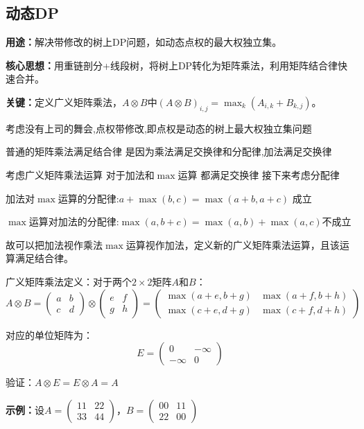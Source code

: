 \documentclass[a4paper, fontset=none]{ctexart}
\begin{document}
\subsection{动态DP}
\textbf{用途：}解决带修改的树上DP问题，如动态点权的最大权独立集。

\textbf{核心思想：}用重链剖分+线段树，将树上DP转化为矩阵乘法，利用矩阵结合律快速合并。

\textbf{关键：}定义广义矩阵乘法，$A \otimes B$中$(A \otimes B)_{i, j} = \max_k(A_{i, k} + B_{k, j})$。

考虑没有上司的舞会,点权带修改,即点权是动态的树上最大权独立集问题

普通的矩阵乘法满足结合律 是因为乘法满足交换律和分配律,加法满足交换律

考虑广义矩阵乘法运算 对于加法和$\max$运算 都满足交换律 接下来考虑分配律

加法对$\max$运算的分配律:$a+\max(b, c)=\max(a+b, a+c)$ 成立

$\max$运算对加法的分配律:$\max(a, b+c)=\max(a, b)+\max(a, c)$不成立

故可以把加法视作乘法$\max$运算视作加法，定义新的广义矩阵乘法运算，且该运算满足结合律。

广义矩阵乘法定义：对于两个$2 \times 2$矩阵$A$和$B$：
\[A \otimes B = \begin{pmatrix}a&b\\c&d\end{pmatrix} \otimes \begin{pmatrix}e&f\\g&h\end{pmatrix} = \begin{pmatrix}\max(a+e, b+g) & \max(a+f, b+h) \\ \max(c+e, d+g) & \max(c+f, d+h)\end{pmatrix}\]

对应的单位矩阵为：
\[E = \begin{pmatrix}0 & -\infty \\ -\infty & 0\end{pmatrix}\]

验证：$A \otimes E = E \otimes A = A$

\textbf{示例：}设$A = \begin{pmatrix}1 1&2 2\\3 3&4 4\end{pmatrix}$，$B = \begin{pmatrix}0 0&1 1\\2 2&0 0\end{pmatrix}$
\end{document}
